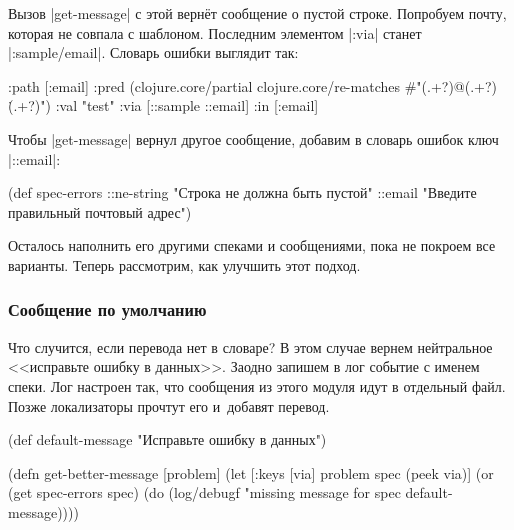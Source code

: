 Вызов \spverb|get-message| с этой верн\"{е}т сообщение о пустой строке. Попробуем
почту, которая не совпала с шаблоном. Последним элементом \spverb|:via| станет
\spverb|:sample/email|. Словарь ошибки выглядит так:

\begin{english}
  \begin{clojure}
{:path [:email]
 :pred
 (clojure.core/partial
  clojure.core/re-matches
  #"(.+?)@(.+?)\.(.+?)")
 :val "test"
 :via [::sample ::email]
 :in [:email]}
  \end{clojure}
\end{english}

Чтобы \spverb|get-message| вернул другое сообщение, добавим в словарь ошибок
ключ \spverb|::email|:

  \begin{clojure}
(def spec-errors
  {::ne-string "Строка не должна быть пустой"
   ::email "Введите правильный почтовый адрес"})
  \end{clojure}

Осталось наполнить его другими спеками и сообщениями, пока не покроем все
варианты. Теперь рассмотрим, как улучшить этот подход.

\subsubsection{Сообщение по умолчанию}

Что случится, если перевода нет в словаре? В этом случае вернем нейтральное
<<исправьте ошибку в данных>>. Заодно запишем в лог событие с именем спеки. Лог
настроен так, что сообщения из этого модуля идут в отдельный файл. Позже
локализаторы прочтут его и~добавят перевод.

  \begin{clojure}
(def default-message
  "Исправьте ошибку в данных")
  \end{clojure}

\begin{english}
  \begin{clojure}
(defn get-better-message [problem]
  (let [{:keys [via]} problem
        spec (peek via)]
    (or (get spec-errors spec)
        (do (log/debugf "missing message for spec %
            default-message))))
  \end{clojure}
\end{english}

